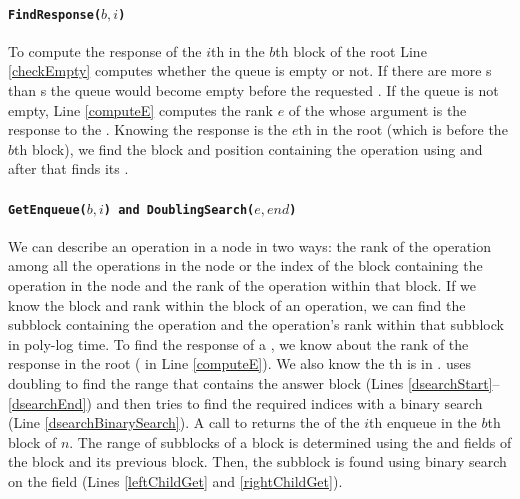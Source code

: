 \paragraph{\tt{FindResponse($b, i$)}}
To compute the response of the $i$th  in the $b$th block
of the root Line \ref{checkEmpty} computes whether the queue is empty
or not. If there are more s than s the queue
would become empty before the requested . If the queue is
not empty, Line \ref{computeE} computes the rank $e$ of the
 whose argument is the response to the
. Knowing the response is the $e$th  in the
root (which is before the $b$th block), we find the block and position
containing the  operation using  and
after that  finds its . 

\paragraph{\tt{GetEnqueue($b,i$)} and \tt{DoublingSearch($e, end$)}}
We can describe an operation in a node in two ways: the rank of the
operation among all the operations in the node or the index of the
block containing the operation in the node and the rank of the
operation within that block. If we know the block and rank within the
block of an operation, we can find the subblock containing the
operation and the operation's rank within that subblock in poly-log
time. To find the response of a , we know about the  rank
of the response  in the root ( in Line
\ref{computeE}). 
We also know the th  is in
.  uses doubling to find
the range that contains the answer block (Lines
\ref{dsearchStart}--\ref{dsearchEnd}) and then tries to find the
required indices with a binary search (Line
\ref{dsearchBinarySearch}). 
A call to  returns the  of the
$i$th enqueue in the $b$th block of $n$. The range of subblocks of a
block is determined using the  and
 fields of the block and its previous block. Then,
the subblock is found using binary search on the 
field (Lines \ref{leftChildGet} and \ref{rightChildGet}). 


